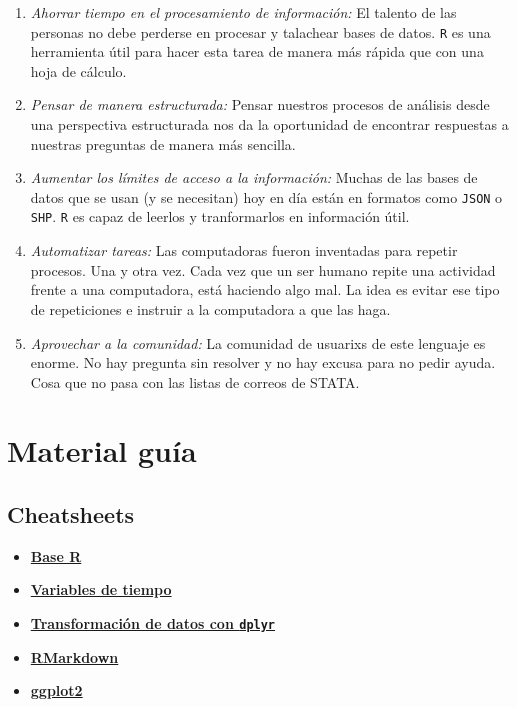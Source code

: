 \documentclass[]{article}
\begin{document}
\begin{enumerate}
\def\labelenumi{\arabic{enumi}.}
\item
  \emph{Ahorrar tiempo en el procesamiento de información:} El talento
  de las personas no debe perderse en procesar y talachear bases de
  datos. \texttt{R} es una herramienta útil para hacer esta tarea de
  manera más rápida que con una hoja de cálculo.
\item
  \emph{Pensar de manera estructurada:} Pensar nuestros procesos de
  análisis desde una perspectiva estructurada nos da la oportunidad de
  encontrar respuestas a nuestras preguntas de manera más sencilla.
\item
  \emph{Aumentar los límites de acceso a la información:} Muchas de las
  bases de datos que se usan (y se necesitan) hoy en día están en
  formatos como \texttt{JSON} o \texttt{SHP}. \texttt{R} es capaz de
  leerlos y tranformarlos en información útil.
\item
  \emph{Automatizar tareas:} Las computadoras fueron inventadas para
  repetir procesos. Una y otra vez. Cada vez que un ser humano repite
  una actividad frente a una computadora, está haciendo algo mal. La
  idea es evitar ese tipo de repeticiones e instruir a la computadora a
  que las haga.
\item
  \emph{Aprovechar a la comunidad:} La comunidad de usuarixs de este
  lenguaje es enorme. No hay pregunta sin resolver y no hay excusa para
  no pedir ayuda. Cosa que no pasa con las listas de correos de STATA.
\end{enumerate}

\section{Material guía}\label{material-guia}

\subsection{Cheatsheets}\label{cheatsheets}

\begin{itemize}
\item
  \href{https://www.rstudio.com/wp-content/uploads/2016/10/r-cheat-sheet-3.pdf}{\textbf{Base
  R}}
\item
  \href{https://github.com/rstudio/cheatsheets/raw/master/lubridate.pdf}{\textbf{Variables
  de tiempo}}
\item
  \href{https://github.com/rstudio/cheatsheets/raw/master/data-transformation.pdf}{\textbf{Transformación
  de datos con \texttt{dplyr}}}
\item
  \href{https://www.rstudio.com/wp-content/uploads/2015/03/rmarkdown-reference.pdf}{\textbf{RMarkdown}}
\item
  \href{https://github.com/rstudio/cheatsheets/raw/master/data-visualization-2.1.pdf}{\textbf{ggplot2}}
\end{itemize}
\end{document}
